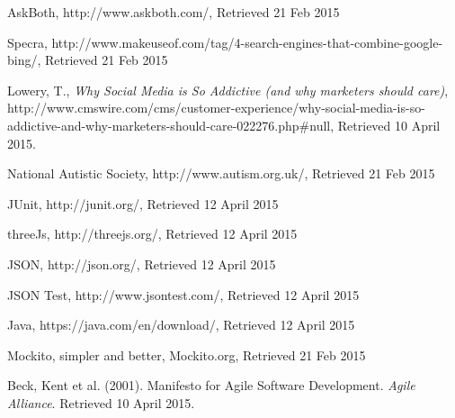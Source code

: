 \documentclass[a4paper, 11pt]{article}
\begin{document}
\begin{thebibliography}{100}
 AskBoth, http://www.askboth.com/, Retrieved 21 Feb 2015 

 Specra, http://www.makeuseof.com/tag/4-search-engines-that-combine-google-bing/, Retrieved 21 Feb 2015 

 Lowery, T., \textit{Why Social Media is So Addictive (and why marketers should care)}, http://www.cmswire.com/cms/customer-experience/why-social-media-is-so-addictive-and-why-marketers-should-care-022276.php\#null, Retrieved 10 April 2015.

 National Autistic Society, http://www.autism.org.uk/, Retrieved 21 Feb 2015

 JUnit, http://junit.org/, Retrieved 12 April 2015

 threeJs, http://threejs.org/, Retrieved 12 April 2015 

 JSON, http://json.org/, Retrieved 12 April 2015

 JSON Test, http://www.jsontest.com/, Retrieved 12 April 2015

 Java,  https://java.com/en/download/, Retrieved 12 April 2015

 Mockito, simpler and better, Mockito.org, Retrieved 21 Feb 2015

 Beck, Kent et al. (2001). Manifesto for Agile Software Development. \textit{Agile Alliance}. Retrieved 10 April 2015.

\end{thebibliography}
\end{document}
